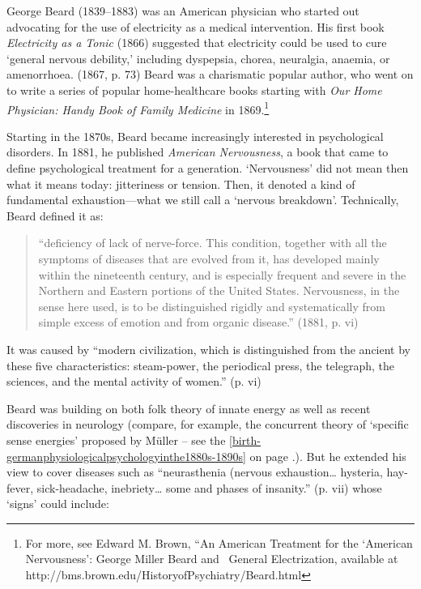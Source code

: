 George Beard (1839--1883) was an American physician who started out advocating for the use of electricity as a medical intervention. His first book \emph{Electricity as a Tonic} (1866) suggested that electricity could be used to cure `general nervous debility,' including dyspepsia, chorea, neuralgia, anaemia, or amenorrhoea. (1867, p. 73) Beard was a charismatic popular author, who went on to write a series of popular home-healthcare books starting with \emph{Our Home Physician: Handy Book of Family Medicine} in 1869.\footnote{For more, see Edward M. Brown, “An American Treatment for the `American Nervousness': George Miller Beard and  General Electrization, available at http:\slash \slash bms.brown.edu\slash HistoryofPsychiatry\slash Beard.html}

Starting in the 1870s, Beard became increasingly interested in psychological disorders. In 1881, he published \emph{American Nervousness}, a book that came to define psychological treatment for a generation. `Nervousness' did not mean then what it means today: jitteriness or tension. Then, it denoted a kind of fundamental exhaustion—what we still call a `nervous breakdown'. Technically, Beard defined it as:

\begin{quote}

“deficiency of lack of nerve-force. This condition, together with all the symptoms of diseases that are evolved from it, has developed mainly within the nineteenth century, and is especially frequent and severe in the Northern and Eastern portions of the United States. Nervousness, in the sense here used, is to be distinguished rigidly and systematically from simple excess of emotion and from organic disease.” (1881, p. vi)
\end{quote}

It was caused by “modern civilization, which is distinguished from the ancient by these five characteristics: steam-power, the periodical press, the telegraph, the sciences, and the mental activity of women.” (p. vi)

Beard was building on both folk theory of innate energy as well as recent discoveries in neurology (compare, for example, the concurrent theory of `specific sense energies' proposed by Müller – see the \ref{birth-germanphysiologicalpsychologyinthe1880s-1890s} on page \pageref{birth-germanphysiologicalpsychologyinthe1880s-1890s}.). But he extended his view to cover diseases such as “neurasthenia (nervous exhaustion{\ldots} hysteria, hay-fever, sick-headache, inebriety{\ldots} some and phases of insanity.” (p. vii) whose `signs' could include:

